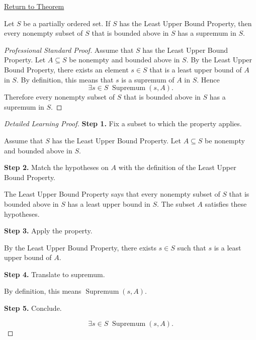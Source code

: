 \newpage
{}
\label{prf:lub-property-implies-existence-of-suprema}

\begin{remark*}[Return]
\hyperref[thm:lub-property-implies-existence-of-suprema]{Return to Theorem}
\end{remark*}

\begin{theorem*}
Let $S$ be a partially ordered set. If $S$ has the Least Upper Bound Property, then every nonempty subset of $S$ that is bounded above in $S$ has a supremum in $S$.
\end{theorem*}

\begin{proof}[Professional Standard Proof]
\LRAProofBodyStart
Assume that $S$ has the Least Upper Bound Property. Let $A \subseteq S$ be nonempty and bounded above in $S$. By the Least Upper Bound Property, there exists an element $s \in S$ that is a least upper bound of $A$ in $S$. By definition, this means that $s$ is a supremum of $A$ in $S$. Hence
\[
\exists s \in S \; \operatorname{Supremum}(s,A).
\]
Therefore every nonempty subset of $S$ that is bounded above in $S$ has a supremum in $S$.
\end{proof}

\begin{proof}[Detailed Learning Proof]
\LRAProofBodyStart

\textbf{Step 1.} Fix a subset to which the property applies.

Assume that $S$ has the Least Upper Bound Property. Let $A \subseteq S$ be nonempty and bounded above in $S$.

\textbf{Step 2.} Match the hypotheses on $A$ with the definition of the Least Upper Bound Property.

The Least Upper Bound Property says that every nonempty subset of $S$ that is bounded above in $S$ has a least upper bound in $S$. The subset $A$ satisfies these hypotheses.

\textbf{Step 3.} Apply the property.

By the Least Upper Bound Property, there exists $s \in S$ such that $s$ is a least upper bound of $A$.

\textbf{Step 4.} Translate to supremum.

By definition, this means $\operatorname{Supremum}(s,A)$.

\textbf{Step 5.} Conclude.

\[
\exists s \in S \; \operatorname{Supremum}(s,A).
\]
\end{proof}

